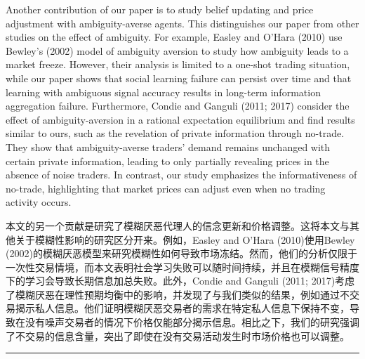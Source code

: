 \documentclass[12pt,a4paper]{article}
\newenvironment{original}{%
  \par\vspace{4pt}\noindent%
  \color{black}%
  \ignorespaces
}{%
  \par\vspace{2pt}%
}
\newenvironment{translation}{%
  \par\vspace{2pt}\noindent%
  \color{transblue}%
  \ignorespaces
}{%
  \par\vspace{4pt}\hrule\vspace{6pt}%
}
\begin{document}
\begin{original}
Another contribution of our paper is to study belief updating and price adjustment with ambiguity-averse agents. This distinguishes our paper from other studies on the effect of ambiguity. For example, Easley and O'Hara (2010) use Bewley's (2002) model of ambiguity aversion to study how ambiguity leads to a market freeze. However, their analysis is limited to a one-shot trading situation, while our paper shows that social learning failure can persist over time and that learning with ambiguous signal accuracy results in long-term information aggregation failure. Furthermore, Condie and Ganguli (2011; 2017) consider the effect of ambiguity-aversion in a rational expectation equilibrium and find results similar to ours, such as the revelation of private information through no-trade. They show that ambiguity-averse traders' demand remains unchanged with certain private information, leading to only partially revealing prices in the absence of noise traders. In contrast, our study emphasizes the informativeness of no-trade, highlighting that market prices can adjust even when no trading activity occurs.
\end{original}
\begin{translation}
本文的另一个贡献是研究了模糊厌恶代理人的信念更新和价格调整。这将本文与其他关于模糊性影响的研究区分开来。例如，Easley and O'Hara (2010)使用Bewley (2002)的模糊厌恶模型来研究模糊性如何导致市场冻结。然而，他们的分析仅限于一次性交易情境，而本文表明社会学习失败可以随时间持续，并且在模糊信号精度下的学习会导致长期信息加总失败。此外，Condie and Ganguli (2011; 2017)考虑了模糊厌恶在理性预期均衡中的影响，并发现了与我们类似的结果，例如通过不交易揭示私人信息。他们证明模糊厌恶交易者的需求在特定私人信息下保持不变，导致在没有噪声交易者的情况下价格仅能部分揭示信息。相比之下，我们的研究强调了不交易的信息含量，突出了即使在没有交易活动发生时市场价格也可以调整。
\end{translation}
\end{document}
